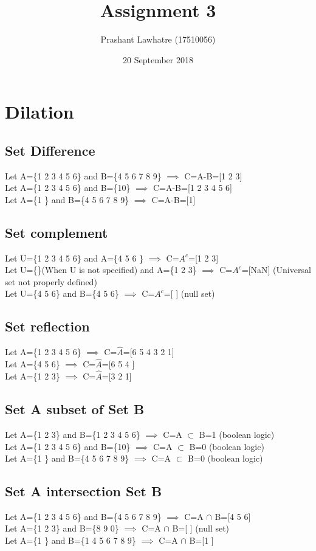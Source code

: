 \documentclass{article}
\title{Assignment 3}
\author{Prashant Lawhatre (17510056)}
\date{20 September 2018}
\begin{document}
\maketitle

\section{Dilation}
    \subsection{ Set Difference}
    Let A=\{1 2 3 4 5 6\} and B=\{4 5 6 7 8 9\} $\implies$ C=A-B=[1 2 3]\\
    Let A=\{1 2 3 4 5 6\} and B=\{10\} $\implies$ C=A-B=[1 2 3 4 5 6]\\
    Let A=\{1 \} and B=\{4 5 6 7 8 9\} $\implies$ C=A-B=[1]\\
    \subsection{ Set complement}
    Let U=\{1 2 3 4 5 6\} and A=\{4 5 6 \} $\implies$ C=$A^c$=[1 2 3]\\
    Let U=\{\}(When U is not specified) and A=\{1 2 3\} $\implies$ C=$A^c$=[NaN] (Universal set not properly defined)\\
    Let U=\{4 5 6\} and B=\{4 5 6\} $\implies$ C=$A^c$=[ ] (null set)\\
    \subsection{Set reflection}
    Let A=\{1 2 3 4 5 6\} $\implies$ C=$\hat{A}$=[6 5 4 3 2 1]\\
    Let A=\{4 5 6\} $\implies$ C=$\hat{A}$=[6 5 4 ]\\
    Let A=\{1 2 3\} $\implies$ C=$\hat{A}$=[3 2 1]\\
    \subsection{Set A subset of Set B}
    Let A=\{1 2 3\} and B=\{1 2 3 4 5 6\} $\implies$ C=A $\subset$ B=1 (boolean logic)\\
    Let A=\{1 2 3 4 5 6\} and B=\{10\} $\implies$ C=A $\subset$ B=0 (boolean logic)\\
    Let A=\{1 \} and B=\{4 5 6 7 8 9\} $\implies$ C=A $\subset$ B=0 (boolean logic)\\
    \subsection{Set A intersection Set B}
    Let A=\{1 2 3 4 5 6\} and B=\{4 5 6 7 8 9\} $\implies$ C=A $\cap$ B=[4 5 6]\\
    Let A=\{1 2 3\} and B=\{8 9 0\} $\implies$ C=A $\cap$ B=[ ] (null set)\\
    Let A=\{1 \} and B=\{1 4 5 6 7 8 9\} $\implies$ C=A $\cap$ B=[1 ]\\
\end{document}
